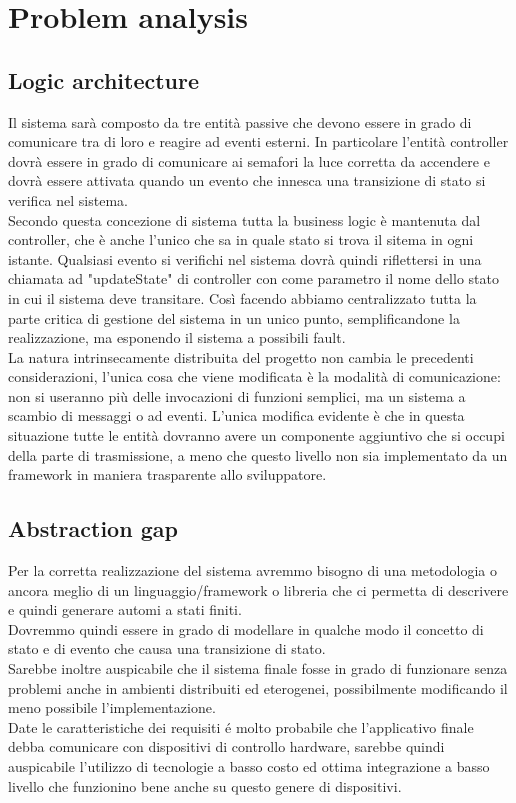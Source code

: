 \documentclass{llncs}
\newcommand{\labelsec}[1]{\label{sec:#1}}
\begin{document}
\section{Problem analysis}
\labelsec{ProblemAnalysis}

\subsection{Logic architecture}
Il sistema sarà composto da tre entità passive che devono essere in grado di comunicare tra di loro e reagire ad eventi esterni. In particolare l'entità controller dovrà essere in grado di comunicare ai semafori la luce corretta da accendere e dovrà essere attivata quando un evento che innesca una transizione di stato si verifica nel sistema.\\
Secondo questa concezione di sistema tutta la business logic è mantenuta dal controller, che è anche l'unico che sa in quale stato si trova il sitema in ogni istante. Qualsiasi evento si verifichi nel sistema dovrà quindi riflettersi in una chiamata ad "updateState" di controller con come parametro il nome dello stato in cui il sistema deve transitare. Così facendo abbiamo centralizzato tutta la parte critica di gestione del sistema in un unico punto, semplificandone la realizzazione, ma esponendo il sistema a possibili fault.\\
La natura intrinsecamente distribuita del progetto non cambia le precedenti considerazioni, l'unica cosa che viene modificata è la modalità di comunicazione: non si useranno più delle invocazioni di funzioni semplici, ma un sistema a scambio di messaggi o ad eventi. L'unica modifica evidente è che in questa situazione tutte le entità dovranno avere un componente aggiuntivo che si occupi della parte di trasmissione, a meno che questo livello non sia implementato da un framework in maniera trasparente allo sviluppatore.\\ 

\subsection{Abstraction gap}
Per la corretta realizzazione del sistema avremmo bisogno di una metodologia o ancora meglio di un linguaggio/framework o libreria che ci permetta di descrivere e quindi generare automi a stati finiti. \\
Dovremmo quindi essere in grado di modellare in qualche modo il concetto di stato e di evento che causa una transizione di stato.\\ 
Sarebbe inoltre auspicabile che il sistema finale fosse in grado di funzionare senza problemi anche in ambienti distribuiti ed eterogenei, possibilmente modificando il meno possibile l'implementazione. \\
Date le caratteristiche dei requisiti \'e molto probabile che l'applicativo finale debba comunicare con dispositivi di controllo hardware, sarebbe quindi auspicabile l'utilizzo di tecnologie a basso costo ed ottima integrazione a basso livello che funzionino bene anche su questo genere di dispositivi.\\ 
\end{document}

